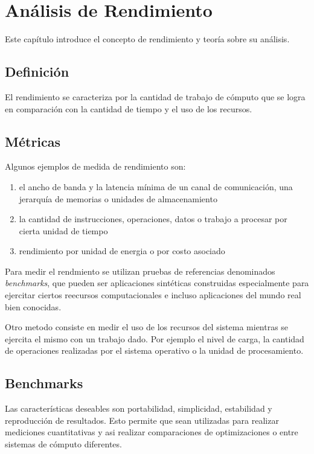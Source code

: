 \documentclass[a4paper]{report}
\begin{document}
\chapter{An\'alisis de Rendimiento}

Este cap\'itulo introduce el concepto de rendimiento y teor\'ia sobre su an\'alisis.

\section{Definici\'on}

El rendimiento se caracteriza por la cantidad de trabajo de c\'omputo que se logra
en comparaci\'on con la cantidad de tiempo y el uso de los recursos.

\section{M\'etricas}

Algunos ejemplos de medida de rendimiento son:

\begin{enumerate}
\item el ancho de banda y la latencia m\'inima de un canal de comunicaci\'on, una jerarqu\'ia de memorias o unidades de almacenamiento
\item la cantidad de instrucciones, operaciones, datos o trabajo a procesar por cierta unidad de tiempo
\item rendimiento por unidad de energia o por costo asociado
\end{enumerate}

Para medir el rendmiento se utilizan pruebas de referencias denominados {\em benchmarks}, que pueden ser aplicaciones sint\'eticas construidas especialmente para ejercitar ciertos
reecursos computacionales e incluso aplicaciones del mundo real bien conocidas.

\bigskip

Otro metodo consiste en medir el uso de los recursos del sistema mientras se ejercita el mismo con un trabajo dado. Por ejemplo el nivel de carga, la cantidad de operaciones realizadas por el sistema operativo o la unidad de procesamiento.

\section{Benchmarks}

Las caracter\'isticas deseables son portabilidad, simplicidad, estabilidad y reproducci\'on de resultados.
Esto permite que sean utilizadas para realizar mediciones cuantitativas y asi realizar comparaciones de optimizaciones o entre sistemas de c\'omputo diferentes.
\end{document}
